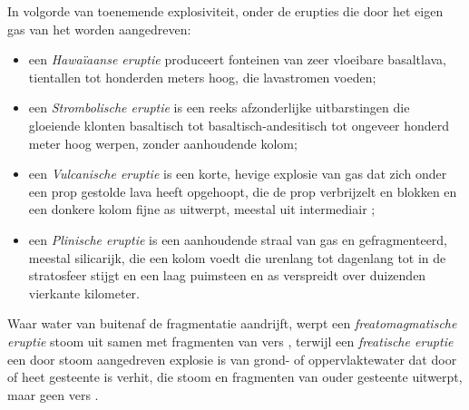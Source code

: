 \begin{definition}[Eruptiestijlen]\label{def:b2:eruptive-styles:styles}
In volgorde van toenemende explosiviteit, onder de erupties die door het eigen gas van het  worden aangedreven:
\begin{itemize}
\item een \emph{Hawaïaanse eruptie} produceert fonteinen van
zeer vloeibare basaltlava, tientallen tot honderden meters hoog, die lavastromen voeden;
\item een \emph{Strombolische eruptie} is een reeks
afzonderlijke uitbarstingen die gloeiende klonten basaltisch tot
basaltisch-andesitisch  tot ongeveer honderd meter hoog werpen, zonder aanhoudende
kolom;
\item een \emph{Vulcanische eruptie} is een korte, hevige
explosie van gas dat zich onder een prop gestolde lava heeft opgehoopt, die
de prop verbrijzelt en blokken en een donkere kolom fijne as uitwerpt, meestal uit
intermediair ;
\item een \emph{Plinische eruptie} is een aanhoudende straal van gas
en gefragmenteerd, meestal silicarijk,  die een kolom voedt die urenlang tot dagenlang tot in de
stratosfeer stijgt en een laag puimsteen en as verspreidt over
duizenden vierkante kilometer.
\end{itemize}
Waar water van buitenaf de fragmentatie aandrijft, werpt een \emph{freatomagmatische
eruptie} stoom uit samen met fragmenten
van vers , terwijl een \emph{freatische eruptie} een
door stoom aangedreven explosie is van grond- of oppervlaktewater dat door  of heet gesteente is verhit,
die stoom en fragmenten van ouder gesteente uitwerpt, maar geen vers .
\end{definition}

